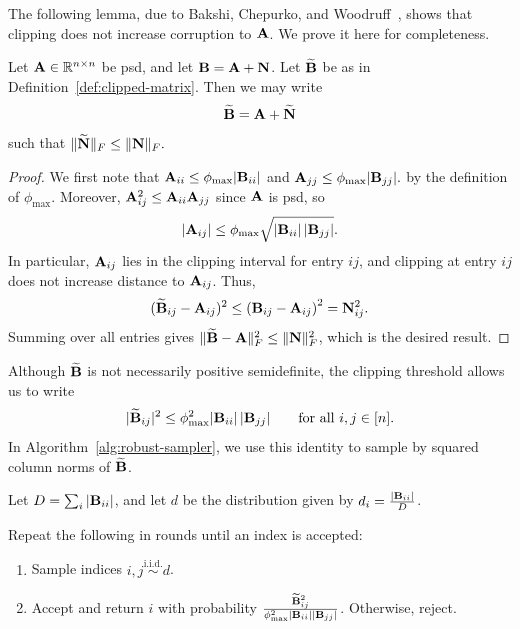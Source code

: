 The following lemma, due to Bakshi, Chepurko, and Woodruff~\cite{bakshi_robust_2020}, shows that clipping does not increase corruption to $\mathbf{A}$. We prove it here for completeness.
\begin{lemma}
    \label{lem:clipping-lemma}
    Let \(\mathbf{A}\in\mathbb{R}^{n\times n}\) be psd, and let \(\mathbf{B}=\mathbf{A}+\mathbf{N}\). Let $\widetilde{\mathbf{B}}$ be as in Definition~\ref{def:clipped-matrix}. Then we may write
    \[
        \widetilde{\mathbf{B}} = \mathbf{A}+\widetilde{\mathbf{N}}
    \]
    such that
    \(
        \|\widetilde{\mathbf{N}}\|_F \leq \|\mathbf{N}\|_F.
    \)
\end{lemma}

\begin{proof}
    We first note that
\(
    \mathbf{A}_{ii}\leq \phi_{\max}|\mathbf{B}_{ii}|
\) and \(
    \mathbf{A}_{jj}\leq \phi_{\max}|\mathbf{B}_{jj}|.
\)
by the definition of $\phi_{\max}$. Moreover, $\mathbf{A}_{ij}^2\leq \mathbf{A}_{ii}\mathbf{A}_{jj}$ since $\mathbf{A}$ is psd, so
\[
    |\mathbf{A}_{ij}|
    \leq
    \phi_{\max}\sqrt{|\mathbf{B}_{ii}|\,|\mathbf{B}_{jj}|}.
\]
In particular, $\mathbf{A}_{ij}$ lies in the clipping interval for entry $ij$, and clipping at entry $ij$ does not increase distance to $\mathbf{A}_{ij}$. Thus,
\[
    (\widetilde{\mathbf{B}}_{ij}-\mathbf{A}_{ij})^2
    \leq
    \left(\mathbf{B}_{ij}-\mathbf{A}_{ij}\right)^2
    =
    \mathbf{N}_{ij}^2.
\]
Summing over all entries gives $\|\widetilde{\mathbf{B}} - \mathbf{A}\|^2_F\leq \|\mathbf{N}\|^2_F$, which is the desired result.
\end{proof}

Although \(\widetilde{\mathbf{B}}\) is not necessarily positive semidefinite, the clipping threshold allows us to write
\[
    |\widetilde{\mathbf{B}}_{ij}|^2
    \leq
    \phi_{\max}^2 |\mathbf{B}_{ii}|\,|\mathbf{B}_{jj}|\qquad\text{for all $i,j\in[n]$.}
\]
In Algorithm~\ref{alg:robust-sampler}, we use this identity to sample by squared column norms of $\widetilde {\mathbf{B}}$.


\begin{algorithm}[H]
\caption{Fast Length-Squared Sampling (Robust LRA)}
\label{alg:robust-sampler}

\noindent
Let $D = \sum_i |\mathbf{B}_{ii}|$, and let \(d\) be the distribution given by $d_i = \frac{|\mathbf{B}_{ii}|}{D}$.

\smallskip
\noindent
Repeat the following in rounds until an index is accepted:
\begin{enumerate}[
    label=\arabic*.,
    leftmargin=2em,
    itemsep=0.35em,
    topsep=0.45em,
    parsep=0pt
]
    \item Sample indices \(i,j \overset{\mathrm{i.i.d.}}{\sim} d\).

    \item Accept and return \(i\) with probability
    $\frac{\widetilde{\mathbf{B}}_{ij}^2}{\phi_{\max}^2|\mathbf{B}_{ii}||\mathbf{B}_{jj}|}$.
    Otherwise, reject.
\end{enumerate}
\end{algorithm}

